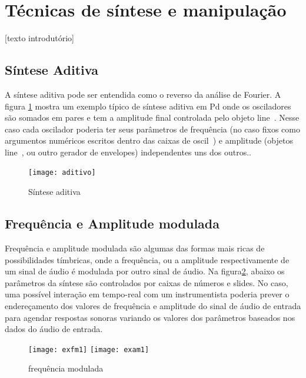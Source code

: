 \documentclass[12pt]{article}
\begin{document}
\section{Técnicas de síntese e manipulação}
\label{sec:tecnicas-de-sintese}


 [texto introdutório]

\subsection{Síntese Aditiva}

A síntese aditiva pode ser entendida como o reverso da análise de Fourier. 
A figura \ref{fig:aditivo} mostra um exemplo típico de síntese aditiva em Pd onde os osciladores 
são somados em pares e tem a amplitude final controlada pelo objeto line~. Nesse caso 
cada oscilador poderia ter seus parâmetros de frequência (no caso fixos como argumentos 
numéricos escritos dentro das caixas de oscil~) e amplitude (objetos line~, ou outro 
gerador de envelopes) independentes uns dos outros..





\begin{figure}[hp]
  \centering
  \texttt{[image: aditivo]}
  \caption{Síntese aditiva}
  \label{fig:aditivo}
\end{figure}

\subsection{Frequência  e Amplitude modulada}

Frequência e amplitude modulada são algumas das formas mais ricas de possibilidades tímbricas, onde a 
frequência, ou a amplitude respectivamente de um sinal de áudio é modulada por outro sinal de áudio. 
Na figura\ref{fig:modulada}, abaixo os parâmetros da síntese são controlados por caixas de números e 
slides. No caso, uma possível interação em tempo-real com um instrumentista poderia prever o endereçamento 
dos valores de frequência e amplitude do sinal de áudio de entrada para agendar respostas sonoras variando os 
valores dos parâmetros baseados nos dados do áudio de entrada.

\begin{figure}[hp]
  \centering
  \texttt{[image: exfm1]}
    \texttt{[image: exam1]}
  \caption{frequência modulada}
  \label{fig:modulada}
\end{figure}
\end{document}
